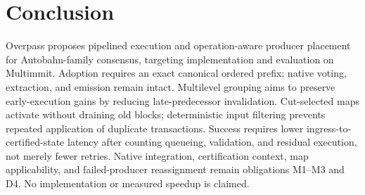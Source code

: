 \section{Conclusion}
\label{sec:conclusion}

Overpass proposes pipelined execution and operation-aware producer placement for Autobahn-family consensus, targeting implementation and evaluation on Multimmit. Adoption requires an exact canonical ordered prefix; native voting, extraction, and emission remain intact. Multilevel grouping aims to preserve early-execution gains by reducing late-predecessor invalidation. Cut-selected maps activate without draining old blocks; deterministic input filtering prevents repeated application of duplicate transactions. Success requires lower ingress-to-certified-state latency after counting queueing, validation, and residual execution, not merely fewer retries. Native integration, certification context, map applicability, and failed-producer reassignment remain obligations M1--M3 and D4. No implementation or measured speedup is claimed.


